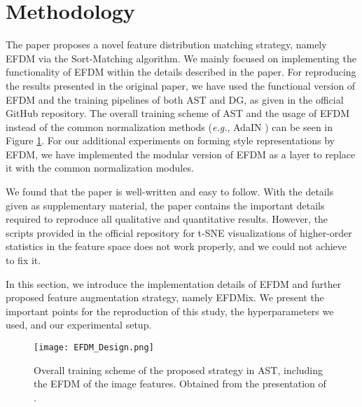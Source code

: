 \section{Methodology}

The paper proposes a novel feature distribution matching strategy, namely EFDM via the Sort-Matching algorithm. We mainly focused on implementing the functionality of EFDM within the details described in the paper. For reproducing the results presented in the original paper, we have used the functional version of EFDM and the training pipelines of both AST and DG, as given in the official GitHub repository.  The overall training scheme of AST and the usage of EFDM instead of the common normalization methods (\textit{e.g.}, AdaIN \cite{huang2017arbitrary}) can be seen in Figure \ref{fig:ast-training}. For our additional experiments on forming style representations by EFDM, we have implemented the modular version of EFDM as a layer to replace it with the common  normalization modules. 

We found that the paper is well-written and easy to follow. With the details given as supplementary material, the paper contains the important details required to reproduce all qualitative and quantitative results. However, the scripts provided in the official repository for t-SNE visualizations of higher-order statistics in the feature space does not work properly, and we could not achieve to fix it. 



In this section, we introduce the implementation details of EFDM and further proposed feature augmentation strategy, namely EFDMix. We present the important points for the reproduction of this study, the hyperparameters we used, and our experimental setup. 

\begin{figure}[!t]
    \centering
    \texttt{[image: EFDM\_Design.png]}
    \caption{Overall training scheme of the proposed strategy in AST, including the EFDM of the image features. Obtained from the presentation of \cite{zhang2021exact}.}
    \label{fig:ast-training}
\end{figure}

